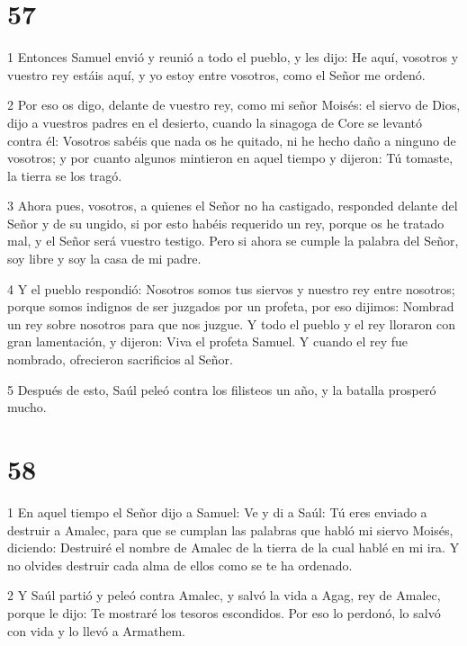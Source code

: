 \chapter{57}

\par 1 Entonces Samuel envió y reunió a todo el pueblo, y les dijo: He aquí, vosotros y vuestro rey estáis aquí, y yo estoy entre vosotros, como el Señor me ordenó.

\par 2 Por eso os digo, delante de vuestro rey, como mi señor Moisés: el siervo de Dios, dijo a vuestros padres en el desierto, cuando la sinagoga de Core se levantó contra él: Vosotros sabéis que nada os he quitado, ni he hecho daño a ninguno de vosotros; y por cuanto algunos mintieron en aquel tiempo y dijeron: Tú tomaste, la tierra se los tragó.

\par 3 Ahora pues, vosotros, a quienes el Señor no ha castigado, responded delante del Señor y de su ungido, si por esto habéis requerido un rey, porque os he tratado mal, y el Señor será vuestro testigo. Pero si ahora se cumple la palabra del Señor, soy libre y soy la casa de mi padre.

\par 4 Y el pueblo respondió: Nosotros somos tus siervos y nuestro rey entre nosotros; porque somos indignos de ser juzgados por un profeta, por eso dijimos: Nombrad un rey sobre nosotros para que nos juzgue. Y todo el pueblo y el rey lloraron con gran lamentación, y dijeron: Viva el profeta Samuel. Y cuando el rey fue nombrado, ofrecieron sacrificios al Señor.

\par 5 Después de esto, Saúl peleó contra los filisteos un año, y la batalla prosperó mucho.

\chapter{58}

\par 1 En aquel tiempo el Señor dijo a Samuel: Ve y di a Saúl: Tú eres enviado a destruir a Amalec, para que se cumplan las palabras que habló mi siervo Moisés, diciendo: Destruiré el nombre de Amalec de la tierra de la cual hablé en mi ira. Y no olvides destruir cada alma de ellos como se te ha ordenado.

\par 2 Y Saúl partió y peleó contra Amalec, y salvó la vida a Agag, rey de Amalec, porque le dijo: Te mostraré los tesoros escondidos. Por eso lo perdonó, lo salvó con vida y lo llevó a Armathem.

